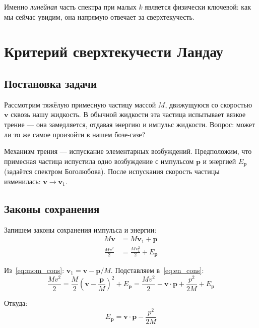 \documentclass[../general/general]{subfiles}
\begin{document}
Именно \emph{линейная} часть спектра при малых $k$ является физически ключевой: как мы сейчас увидим, она напрямую отвечает за сверхтекучесть.


\section{Критерий сверхтекучести Ландау}

\subsection{Постановка задачи}

Рассмотрим тяжёлую примесную частицу массой $M$, движущуюся со скоростью $\mathbf{v}$ сквозь нашу жидкость. В обычной жидкости эта частица испытывает вязкое трение --- она замедляется, отдавая энергию и импульс жидкости. Вопрос: может ли то же самое произойти в нашем бозе-газе?

Механизм трения --- испускание элементарных возбуждений. Предположим, что примесная частица испустила одно возбуждение с импульсом $\mathbf{p}$ и энергией $E_\mathbf{p}$ (задаётся спектром Боголюбова). После испускания скорость частицы изменилась: $\mathbf{v} \to \mathbf{v}_1$.

\subsection{Законы сохранения}

Запишем законы сохранения импульса и энергии:
\begin{align}
    M\mathbf{v} &= M\mathbf{v}_1 + \mathbf{p} \label{eq:mom_cons} \\
    \frac{Mv^2}{2} &= \frac{Mv_1^2}{2} + E_\mathbf{p} \label{eq:en_cons}
\end{align}

Из~\eqref{eq:mom_cons}: $\mathbf{v}_1 = \mathbf{v} - \mathbf{p}/M$. Подставляем в~\eqref{eq:en_cons}:
\begin{equation}
    \frac{Mv^2}{2} = \frac{M}{2}\left(\mathbf{v} - \frac{\mathbf{p}}{M}\right)^2 + E_\mathbf{p}
    = \frac{Mv^2}{2} - \mathbf{v}\cdot\mathbf{p} + \frac{p^2}{2M} + E_\mathbf{p}
\end{equation}

Откуда:
\begin{equation}
    E_\mathbf{p} = \mathbf{v}\cdot\mathbf{p} - \frac{p^2}{2M}
\end{equation}
\end{document}
